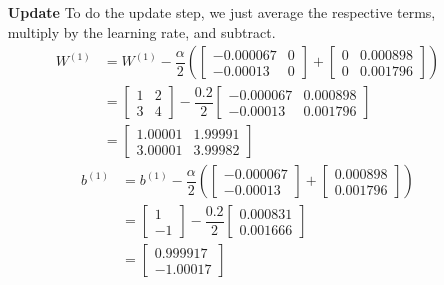 \documentclass[12pt]{article}
\begin{document}
\begin{enumerate}
	\item [\textbf{Update}] To do the update step, we just average the respective terms, multiply by the learning rate, and subtract.
	\begin{align*}
		W^{(1)} &= W^{(1)} - \dfrac{\alpha}{2} \left(
			\begin{bmatrix}
				-0.000067 & 0\\
				-0.00013 & 0
			\end{bmatrix}
			+
			\begin{bmatrix}
				0 & 0.000898\\
				0 & 0.001796
			\end{bmatrix}
			\right)\\
		&= 
			\begin{bmatrix}
				1 & 2\\
				3 & 4
			\end{bmatrix}
			- \dfrac{0.2}{2}
			\begin{bmatrix}
				-0.000067 & 0.000898\\
				-0.00013 & 0.001796
			\end{bmatrix}\\
		&=
			\begin{bmatrix}
				1.00001 & 1.99991\\
				3.00001 & 3.99982
			\end{bmatrix}
	\end{align*}
	\begin{align*}
		b^{(1)} &= b^{(1)} - \dfrac{\alpha}{2}\left(
			\begin{bmatrix}
			-0.000067\\
			-0.00013
			\end{bmatrix}
			+
			\begin{bmatrix}
				0.000898\\
				0.001796
			\end{bmatrix}
			\right)\\
		&= 
			\begin{bmatrix}
				1\\
				-1
			\end{bmatrix}
			- \dfrac{0.2}{2}
			\begin{bmatrix}
				0.000831\\
				0.001666
			\end{bmatrix}\\
		&= 
			\begin{bmatrix}
				0.999917\\
				-1.00017
			\end{bmatrix}
	\end{align*}

\end{enumerate}
\end{document}
